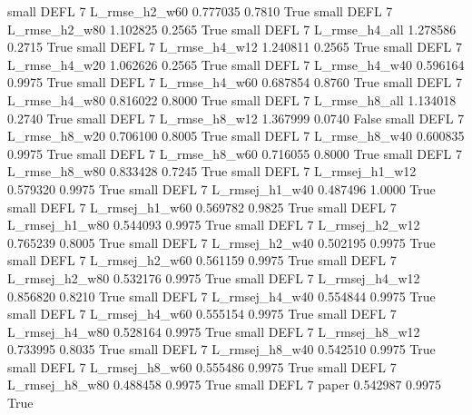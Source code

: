      small     DEFL                 7  L_rmse_h2_w60   0.777035      0.7810    True
     small     DEFL                 7  L_rmse_h2_w80   1.102825      0.2565    True
     small     DEFL                 7  L_rmse_h4_all   1.278586      0.2715    True
     small     DEFL                 7  L_rmse_h4_w12   1.240811      0.2565    True
     small     DEFL                 7  L_rmse_h4_w20   1.062626      0.2565    True
     small     DEFL                 7  L_rmse_h4_w40   0.596164      0.9975    True
     small     DEFL                 7  L_rmse_h4_w60   0.687854      0.8760    True
     small     DEFL                 7  L_rmse_h4_w80   0.816022      0.8000    True
     small     DEFL                 7  L_rmse_h8_all   1.134018      0.2740    True
     small     DEFL                 7  L_rmse_h8_w12   1.367999      0.0740   False
     small     DEFL                 7  L_rmse_h8_w20   0.706100      0.8005    True
     small     DEFL                 7  L_rmse_h8_w40   0.600835      0.9975    True
     small     DEFL                 7  L_rmse_h8_w60   0.716055      0.8000    True
     small     DEFL                 7  L_rmse_h8_w80   0.833428      0.7245    True
     small     DEFL                 7 L_rmsej_h1_w12   0.579320      0.9975    True
     small     DEFL                 7 L_rmsej_h1_w40   0.487496      1.0000    True
     small     DEFL                 7 L_rmsej_h1_w60   0.569782      0.9825    True
     small     DEFL                 7 L_rmsej_h1_w80   0.544093      0.9975    True
     small     DEFL                 7 L_rmsej_h2_w12   0.765239      0.8005    True
     small     DEFL                 7 L_rmsej_h2_w40   0.502195      0.9975    True
     small     DEFL                 7 L_rmsej_h2_w60   0.561159      0.9975    True
     small     DEFL                 7 L_rmsej_h2_w80   0.532176      0.9975    True
     small     DEFL                 7 L_rmsej_h4_w12   0.856820      0.8210    True
     small     DEFL                 7 L_rmsej_h4_w40   0.554844      0.9975    True
     small     DEFL                 7 L_rmsej_h4_w60   0.555154      0.9975    True
     small     DEFL                 7 L_rmsej_h4_w80   0.528164      0.9975    True
     small     DEFL                 7 L_rmsej_h8_w12   0.733995      0.8035    True
     small     DEFL                 7 L_rmsej_h8_w40   0.542510      0.9975    True
     small     DEFL                 7 L_rmsej_h8_w60   0.555486      0.9975    True
     small     DEFL                 7 L_rmsej_h8_w80   0.488458      0.9975    True
     small     DEFL                 7          paper   0.542987      0.9975    True
